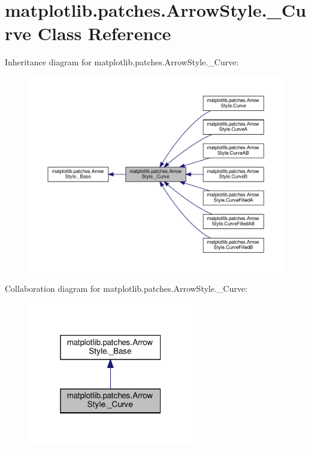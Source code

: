 \hypertarget{classmatplotlib_1_1patches_1_1ArrowStyle_1_1__Curve}{}\section{matplotlib.\+patches.\+Arrow\+Style.\+\_\+\+Curve Class Reference}
\label{classmatplotlib_1_1patches_1_1ArrowStyle_1_1__Curve}


Inheritance diagram for matplotlib.\+patches.\+Arrow\+Style.\+\_\+\+Curve\+:
\nopagebreak
\begin{figure}[H]
\begin{center}
\leavevmode
\includegraphics[width=350pt]{classmatplotlib_1_1patches_1_1ArrowStyle_1_1__Curve__inherit__graph}
\end{center}
\end{figure}


Collaboration diagram for matplotlib.\+patches.\+Arrow\+Style.\+\_\+\+Curve\+:
\nopagebreak
\begin{figure}[H]
\begin{center}
\leavevmode
\includegraphics[width=205pt]{classmatplotlib_1_1patches_1_1ArrowStyle_1_1__Curve__coll__graph}
\end{center}
\end{figure}

